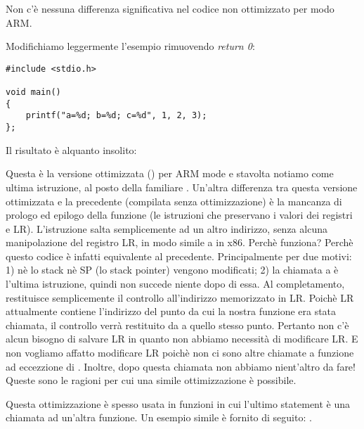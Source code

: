Non c'è nessuna differenza significativa nel codice non ottimizzato per modo ARM.

\label{ARM_B_to_printf}

Modifichiamo leggermente l'esempio rimuovendo \emph{return 0}:

\begin{lstlisting}[style=customc]
#include <stdio.h>

void main()
{
	printf("a=%d; b=%d; c=%d", 1, 2, 3);
};
\end{lstlisting}

Il risultato è alquanto insolito:



Questa è la versione ottimizzata (\Othree) per ARM mode e stavolta notiamo  come ultima istruzione, al posto della familiare .
Un'altra differenza tra questa versione ottimizzata e la precedente (compilata senza ottimizzazione)
è la mancanza di prologo ed epilogo della funzione (le istruzioni che preservano i valori dei registri  e \ac{LR}).
L'istruzione  salta semplicemente ad un altro indirizzo, senza alcuna manipolazione del registro \ac{LR}, in modo simile
a \JMP in x86.
Perchè funziona? Perchè questo codice è infatti equivalente al precedente.
Principalmente per due motivi: 1) nè lo stack nè \ac{SP} (lo \gls{stack pointer}) vengono modificati;
2) la chiamata a \printf è l'ultima istruzione, quindi non succede niente dopo di essa.
Al completamento, \printf restituisce semplicemente il controllo all'indirizzo memorizzato in \ac{LR}.
Poichè \ac{LR} attualmente contiene l'indirizzo del punto da cui la nostra funzione era stata chiamata, 
il controllo verrà restituito da \printf a quello stesso punto.
Pertanto non c'è alcun bisogno di salvare \ac{LR} in quanto non abbiamo necessità di modificare \ac{LR}.
E non vogliamo affatto modificare \ac{LR} poichè non ci sono altre chiamate a funzione ad eccezzione di \printf. Inoltre, dopo
questa chiamata non abbiamo nient'altro da fare!
Queste sono le ragioni per cui una simile ottimizzazione è possibile.

Questa ottimizzazione è spesso usata in funzioni in cui l'ultimo statement è una chiamata ad un'altra funzione.
Un esempio simile è fornito di seguito:
.


